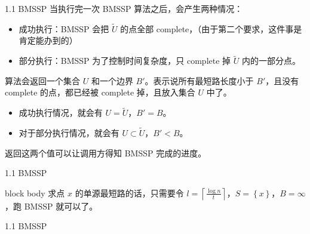 \documentclass{beamer}
\begin{document}
\begin{frame}{1.1 BMSSP}
  当执行完一次 BMSSP 算法之后，会产生两种情况：

  \pause

  \begin{itemize}
    \item 成功执行：BMSSP 会把 $\widetilde{U}$ 的点全部 complete，（由于第二个要求，这件事是肯定能办到的）
    \pause
    \item 部分执行：BMSSP 为了控制时间复杂度，只 complete 掉 $\widetilde{U}$ 内的一部分点。
  \end{itemize}

  \pause\vspace{0.4em}
    算法会返回一个集合 $U$ 和一个边界 $B'$。表示说所有最短路长度小于 $B'$，且没有 complete 的点，都已经被 complete 掉，且放入集合 $U$ 中了。

  \pause
  \begin{itemize}
    \item 成功执行情况，就会有 $U=\widetilde{U}$，$B'=B$。
    \item 对于部分执行情况，就会有 $U\subset \widetilde{U}$，$B'<B$。
  \end{itemize}

  \pause\vspace{0.35em}
  返回这两个值可以让调用方得知 BMSSP 完成的进度。
\end{frame}
\begin{frame}{1.1 BMSSP}
  \begin{beamercolorbox}[sep=0.45em,rounded=true,wd=\linewidth]{block body}
    求点 $x$ 的单源最短路的话，只需要令 $l=\left\lceil \frac{\log n}{t} \right\rceil$，$S=\left\{x\right\}$，$B=\infty$ ，跑 BMSSP 就可以了。
  \end{beamercolorbox}
\end{frame}

\begin{frame}{1.1 BMSSP}
  \begin{center}
  \end{center}
\end{frame}
\end{document}
